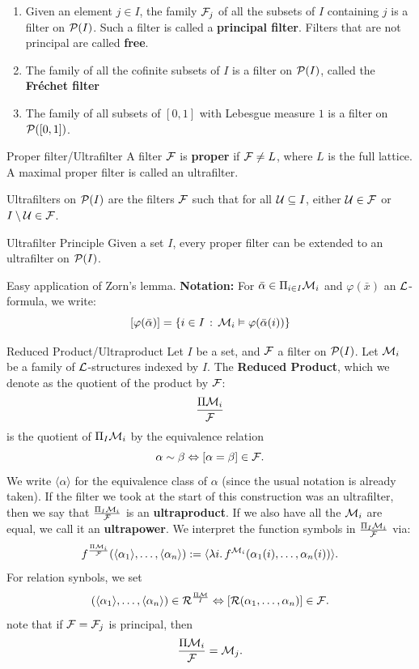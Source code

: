 \documentclass{article}
\numberwithin{thm}{subsection}
\begin{document}
\newlec \begin{exs}
    \begin{enumerate}
        \item Given an element $j \in I$, the family $\mathcal{F}_{j}$ of all the subsets of $I$ containing $j$ is a filter on $\mathcal{P}(I)$. Such a filter is called a \textbf{principal filter}. Filters that are not principal are called \textbf{free}.
        \item The family of all the cofinite subsets of $I$ is a filter on $\mathcal{P}(I)$, called the \textbf{Fr\'echet filter}
        \item The family of all subsets of $[0,1]$ with Lebesgue measure $1$ is a filter on $\mathcal{P}([0,1])$.
    \end{enumerate}
\end{exs}
\begin{fancydefine*}{Proper filter/Ultrafilter}
    A filter $\mathcal{F}$ is \textbf{proper} if $\mathcal{F} \neq L$, where $L$ is the full lattice. A maximal proper filter is called an ultrafilter.
\end{fancydefine*}
Ultrafilters on $\mathcal{P}(I)$ are the filters $\mathcal{F}$ such that for all $\mathcal{U} \subseteq I$, either $\mathcal{U} \in \mathcal{F}$ or $I \setminus \mathcal{U} \in \mathcal{F}$.
\begin{fancyprop}{Ultrafilter Principle}
    Given a set $I$, every proper filter can be extended to an ultrafilter on $\mathcal{P}(I)$.
\end{fancyprop}
\proof Easy application of Zorn's lemma. \endproof
\textbf{Notation: } For $\bar \alpha \in \Pi_{i \in I} \mathcal{M}_{i}$ and $\varphi(\bar x)$ an $\mathcal{L}$-formula, we write: \[ [\varphi(\bar \alpha)] = \{i \in I \, : \, \mathcal{M}_{i} \vDash \varphi(\bar \alpha(i)) \}\]
\begin{fancydefine}{Reduced Product/Ultraproduct}
    Let $I$ be a set, and $\mathcal{F}$ a filter on $\mathcal{P}(I)$. Let $\mathcal{M}_{i}$ be a family of $\mathcal{L}$-structures indexed by $I$. The \textbf{Reduced Product}, which we denote as the quotient of the product by $\mathcal{F}$: \[ \frac{\Pi \mathcal{M}_{i}}{\mathcal{F}}\] is the quotient of $\Pi_{I} \mathcal{M}_{i}$ by the equivalence relation \[ \alpha \sim \beta \Leftrightarrow [\alpha = \beta] \in \mathcal{F}.\] We write $\langle \alpha \rangle$ for the equivalence class of $\alpha$ (since the usual notation is already taken). \gap If the filter we took at the start of this construction was an ultrafilter, then we say that $\frac{\Pi_{I}\mathcal{M}_{i}}{\mathcal{F}}$ is an \textbf{ultraproduct}. If we also have all the $\mathcal{M}_{i}$ are equal, we call it an \textbf{ultrapower}. We interpret the function symbols in $\frac{\Pi_{I}\mathcal{M}_{i}}{\mathcal{F}}$ via: \[ f^{\frac{\Pi \mathcal{M}_{i}}{\mathcal{F}}}(\langle \alpha_{1} \rangle, \dots, \langle \alpha_{n} \rangle) := \langle \lambda i. \, f^{\mathcal{M}_{i}}(\alpha_{1}(i), \dots, \alpha_{n}(i)) \rangle. \] For relation synbols, we set \[ (\langle \alpha_{1} \rangle, \dots, \langle \alpha_{n} \rangle) \in \mathcal{R}^{\frac{\Pi \mathcal{M}}{I}} \Leftrightarrow [\mathcal{R}(\alpha_{1}, \dots, \alpha_{n})] \in \mathcal{F}.\] note that if $\mathcal{F} = \mathcal{F}_{j}$ is principal, then \[ \frac{\Pi \mathcal{M}_{i}}{\mathcal{F}} = \mathcal{M}_{j}. \]
\end{fancydefine}
\end{document}
